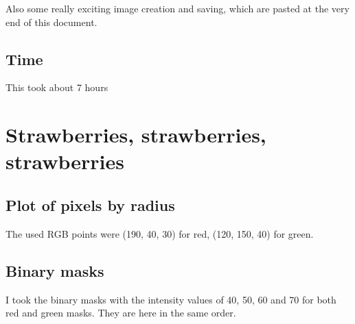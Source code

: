 \documentclass{article}
\begin{document}
Also some really exciting image creation and saving, which are pasted at the very end of this document.

\subsection{Time}
This took about 7 hours
\newpage
\section{Strawberries, strawberries, strawberries}
\subsection{Plot of pixels by radius}




The used RGB points were (190, 40, 30) for red, (120, 150, 40) for green.

\newpage
\subsection{Binary masks}
I took the binary masks with the intensity values of 40, 50, 60 and 70 for both red and green masks. They are here in the same order.
\end{document}
